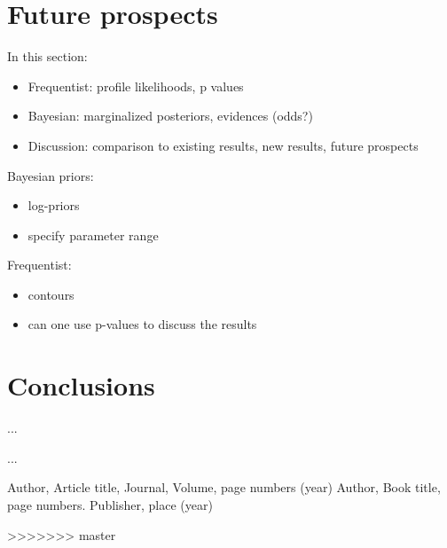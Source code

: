 \section{Future prospects}
\label{examples}

In this section:
\begin{itemize}
  \item Frequentist: profile likelihoods, p values
  \item Bayesian: marginalized posteriors, evidences (odds?)
  \item Discussion: comparison to existing results, new results, future prospects
\end{itemize}

Bayesian priors:
\begin{itemize}
  \item log-priors
  \item specify parameter range
\end{itemize}

Frequentist:
\begin{itemize}
  \item contours
  \item can one use p-values to discuss the results
\end{itemize}

\section{Conclusions}
\label{conc}

...



\begin{acknowledgements}
...
\end{acknowledgements}




\begin{thebibliography}{}
%
%
Author, Article title, Journal, Volume, page numbers (year)
Author, Book title, page numbers. Publisher, place (year)
\end{thebibliography}



>>>>>>> master
